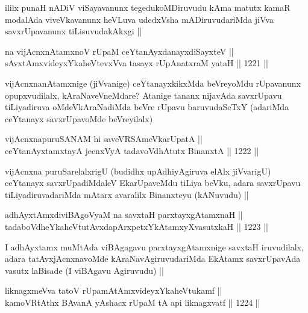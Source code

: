 \begin{artha}
ililx punaH nADiV viSayavanunx tegedukoMDiruvudu kAma matutx kamaR modalAda viveVkavanunx heVLuva udedxVsha mADiruvudariMda jiVva savxrUpavanunx tiLisuvudakAkxgi ||
\end{artha}


\begin{shl}
na vijAcnxnAtamxnoV rUpaM ceYtanAyxdanayxdiSayxteV || \\
sAvxtAmxvideyxYkaheVtevxVva tasayx rUpAnatxraM yataH ||  1221 ||  
\end{shl}

\begin{artha}
vijAcnxnanAtamxnige (jiVvanige) ceYtanayxkikxMda beVreyoMdu rUpavanunx opupxvudilalx, kAraNaveVneMdare? Atanige tananx nijavAda savxrUpavu tiLiyadiruva oMdeVkAraNadiMda beVre rUpavu baruvudaSeTxY (adariMda ceYtanayx savxrUpavoMde beVreyilalx)
\end{artha}

\begin{shl}
vijAcnxnapuruSANAM hi saveVRSAmeVkarUpatA || \\
ceYtanAyxtamxtayA jecnxVyA tadavoVdhAtutx BinanxtA ||  1222 ||  
\end{shl}

\begin{artha}
vijAcnxna puruSarelalxrigU (budidhx upAdhiyAgiruva elAlx jiVvarigU) ceYtanayx savxrUpadiMdaleV EkarUpaveMdu tiLiya beVku, adara savxrUpavu tiLiyadiruvadariMda mAtarx avaralilx Binanxteyu (kANuvudu) ||
\end{artha}


\begin{shl}
adhAyxtAmxdiviBAgoV\s yaM na savxtaH parxtayxgAtamxnaH || \\
tadaboVdheYkaheVtutAvxdapArxpetxYkAtamxyXvasutxkaH ||  1223 ||  
\end{shl}

\begin{artha}
I adhAyxtamx muMtAda viBAgagavu parxtayxgAtamxnige savxtaH iruvudilalx, adara tatAvxjAcnxnavoMde kAraNavAgiruvudariMda EkAtamx savxrUpavAda vasutx laBisade (I viBAgavu Agiruvudu) ||
\end{artha}


\begin{shl}
liknagxmeVva tatoV rUpamAtAmxvideyxYkaheVtukamf || \\
kamoVRtAthx BAvanA yAshacx rUpaM tA api liknagxvatf ||  1224 ||  
\end{shl}

